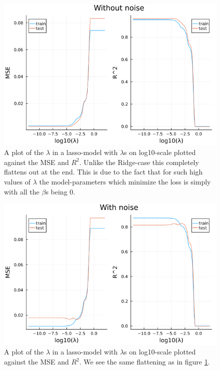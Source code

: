 \documentclass{article}
\begin{document}
\begin{figure}
    \centerline{\includegraphics[scale=0.5]{lasso_without_noise}}
    \caption{A plot of the $\lambda$ in a lasso-model with $\lambda$s on log10-scale plotted against the MSE and $R^2$. Unlike the Ridge-case this completely flattens out at the end. This is due to the fact that for such high values of $\lambda$ the model-parameters which minimize the loss is simply with all the $\beta$s being $0$.}
    \label{Lasso-no-noise}
\end{figure}
\begin{figure}
    \centerline{\includegraphics[scale=0.5]{lasso_with_noise}}
    \caption{A plot of the $\lambda$ in a lasso-model with $\lambda$s on log10-scale plotted against the MSE and $R^2$. We see the same flattening as in figure \ref{Lasso-no-noise}.}
    \label{Lasso-with-noise}
\end{figure}
\end{document}

